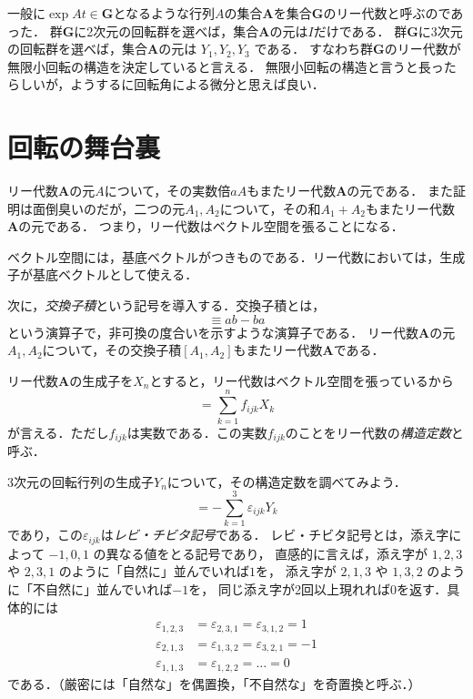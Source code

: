 \documentclass{jsbook}
\newcommand{\keyword}[1]{\emph{#1}}
\newcommand{\bg}[1]{\mathbf{#1}}
\begin{document}
一般に$\exp At\in\bg{G}$となるような行列$A$の集合$\bg{A}$を集合$\bg{G}$のリー代数と呼ぶのであった．
群$\bg{G}$に2次元の回転群を選べば，集合$\bg{A}$の元は$I$だけである．
群$\bg{G}$に3次元の回転群を選べば，集合$\bg{A}$の元は $Y_1,Y_2,Y_3$ である．
すなわち群$\bg{G}$のリー代数が無限小回転の構造を決定していると言える．
無限小回転の構造と言うと長ったらしいが，ようするに回転角による微分と思えば良い．

\section{回転の舞台裏}

リー代数$\bg{A}$の元$A$について，その実数倍$aA$もまたリー代数$\bg{A}$の元である．
また証明は面倒臭いのだが，二つの元$A_1,A_2$について，その和$A_1+A_2$もまたリー代数$\bg{A}$の元である．
つまり，リー代数はベクトル空間を張ることになる．

ベクトル空間には，基底ベクトルがつきものである．リー代数においては，生成子が基底ベクトルとして使える．

次に，\keyword{交換子積}という記号を導入する．交換子積とは，
\begin{equation}
[a,b]\equiv ab-ba
\end{equation}
という演算子で，非可換の度合いを示すような演算子である．
リー代数$\bg{A}$の元$A_1,A_2$について，その交換子積$[A_1,A_2]$もまたリー代数$\bg{A}$である．

リー代数$\bg{A}$の生成子を$X_n$とすると，リー代数はベクトル空間を張っているから
\begin{equation}
[X_i,X_j]=\sum_{k=1}^nf_{ijk}X_k
\end{equation}
が言える．ただし$f_{ijk}$は実数である．この実数$f_{ijk}$のことをリー代数の\keyword{構造定数}と呼ぶ．

3次元の回転行列の生成子$Y_n$について，その構造定数を調べてみよう．
\begin{equation}
[Y_i,Y_j]=-\sum_{k=1}^3\varepsilon_{ijk}Y_k
\end{equation}
であり，この$\varepsilon_{ijk}$は\keyword{レビ・チビタ記号}である．
レビ・チビタ記号とは，添え字によって $-1,0,1$ の異なる値をとる記号であり，
直感的に言えば，添え字が $1,2,3$ や $2,3,1$ のように「自然に」並んでいれば$1$を，
添え字が $2,1,3$ や $1,3,2$ のように「不自然に」並んでいれば$-1$を，
同じ添え字が2回以上現れれば$0$を返す．具体的には
\begin{align}
\varepsilon_{1,2,3}&=\varepsilon_{2,3,1}=\varepsilon_{3,1,2}=1\\
\varepsilon_{2,1,3}&=\varepsilon_{1,3,2}=\varepsilon_{3,2,1}=-1\\
\varepsilon_{1,1,3}&=\varepsilon_{1,2,2}=\dots=0
\end{align}
である．（厳密には「自然な」を偶置換，「不自然な」を奇置換と呼ぶ．）
\end{document}
